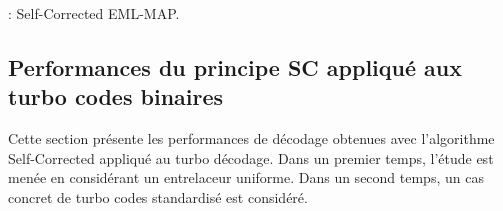 \begin{center}
\begin{minipage}{.6\textwidth}%
	\begin{algorithm}[H]
		\DontPrintSemicolon
		
		{
			\DA\;
			{
			}
			\DB\;
			{
			}
		}
	\caption{: Self-Corrected EML-MAP.}
	\label{alg:sc1}
	\end{algorithm}
\end{minipage}
\end{center}

\subsection{Performances du principe SC appliqué aux turbo codes binaires}
Cette section présente les performances de décodage obtenues avec l'algorithme Self-Corrected appliqué au turbo décodage. Dans un premier temps, 
l'étude est menée en considérant un entrelaceur uniforme. Dans un second temps, un cas concret de turbo codes standardisé est considéré.
